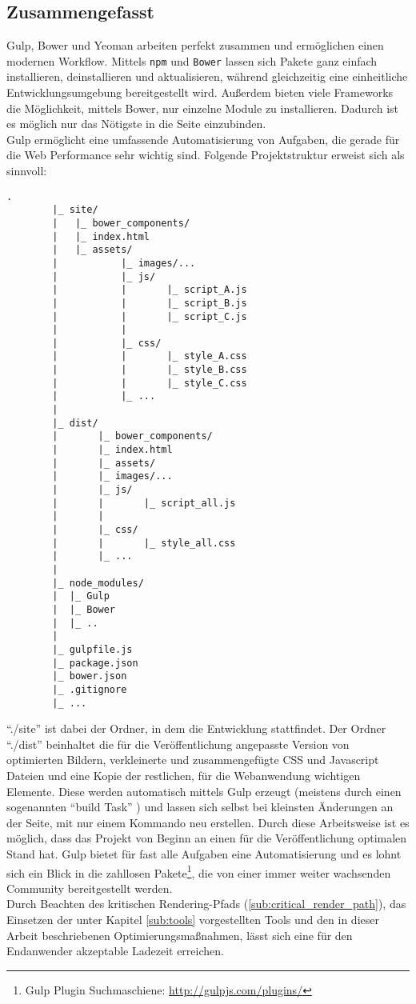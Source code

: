 		
	\pagebreak

	\subsection{Zusammengefasst}
	\label{sub:zusammengefasst}
		Gulp, Bower und Yeoman arbeiten perfekt zusammen und ermöglichen einen modernen Workflow. Mittels \texttt{npm} und \texttt{Bower} lassen sich Pakete ganz einfach installieren, deinstallieren und aktualisieren, während gleichzeitig eine einheitliche Entwicklungsumgebung bereitgestellt wird. Außerdem bieten viele Frameworks die Möglichkeit, mittels Bower, nur einzelne Module zu installieren. Dadurch ist es möglich nur das Nötigste in die Seite einzubinden.\\ Gulp ermöglicht eine umfassende Automatisierung von Aufgaben, die gerade für die Web Performance sehr wichtig sind. Folgende Projektstruktur erweist sich als sinnvoll:

		\begin{lstlisting}[captionpos=b, caption=Projektstruktur, label=lst:projectTree]
		.
		|_ site/
		|	|_ bower_components/
		|	|_ index.html
		|	|_ assets/
		|			|_ images/...
		|			|_ js/
		|			|		|_ script_A.js
		|			|		|_ script_B.js
		|			|		|_ script_C.js
		|			|
		|			|_ css/
		|			|		|_ style_A.css
		|			|		|_ style_B.css
		|			|		|_ style_C.css
		|			|_ ...
		|
		|_ dist/
		|		|_ bower_components/
		|		|_ index.html
		|		|_ assets/
		|		|_ images/...
		|		|_ js/
		|		|		|_ script_all.js
		|		|
		|		|_ css/
		|		|		|_ style_all.css
		|		|_ ...
		|
		|_ node_modules/
		|  |_ Gulp
		|  |_ Bower
		|  |_ ..
		|
		|_ gulpfile.js
		|_ package.json
		|_ bower.json
		|_ .gitignore
		|_ ...
		\end{lstlisting}

		"`./site"' ist dabei der Ordner, in dem die Entwicklung stattfindet. Der Ordner "`./dist"' beinhaltet die für die Veröffentlichung angepasste Version von optimierten Bildern, verkleinerte und zusammengefügte CSS und Javascript Dateien und eine Kopie der restlichen, für die Webanwendung wichtigen Elemente. Diese werden automatisch mittels Gulp erzeugt (meistens durch einen sogenannten "`build Task"' ) und lassen sich selbst bei kleinsten Änderungen an der Seite, mit nur einem Kommando neu erstellen. Durch diese Arbeitsweise ist es möglich, dass das Projekt von Beginn an einen für die Veröffentlichung optimalen Stand hat. Gulp bietet für fast alle Aufgaben eine Automatisierung und es lohnt sich ein Blick in die zahllosen Pakete\footnote{Gulp Plugin Suchmaschiene: \url{http://gulpjs.com/plugins/}}, die von einer immer weiter wachsenden Community bereitgestellt werden.\\
		Durch Beachten des kritischen Rendering-Pfads (\ref{sub:critical_render_path}), das Einsetzen der unter Kapitel \ref{sub:tools} vorgestellten Tools und den in dieser Arbeit beschriebenen Optimierungsmaßnahmen, lässt sich eine für den Endanwender akzeptable Ladezeit erreichen.


\pagebreak